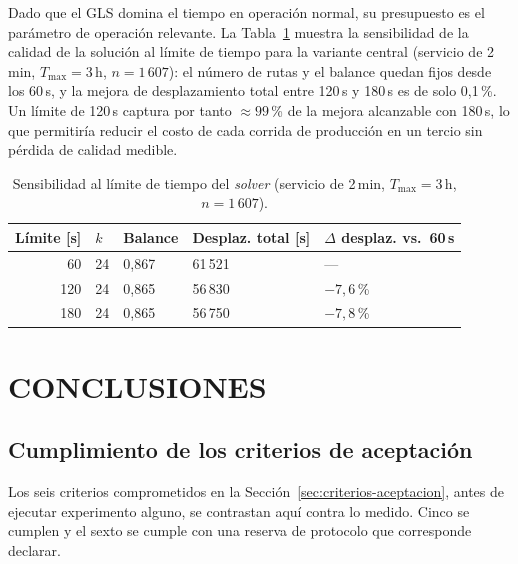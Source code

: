 Dado que el GLS domina el tiempo en operación normal, su presupuesto es el
parámetro de operación relevante. La Tabla~\ref{tab:sensibilidad-tl} muestra la
sensibilidad de la calidad de la solución al límite de tiempo para la variante
central (servicio de 2\,min, $T_{\max}=3$\,h, $n=1\,607$): el número de rutas y
el balance quedan fijos desde los 60\,s, y la mejora de desplazamiento total
entre 120\,s y 180\,s es de solo 0,1\,\%. Un límite de 120\,s captura por tanto
$\approx 99$\,\% de la mejora alcanzable con 180\,s, lo que permitiría reducir
el costo de cada corrida de producción en un tercio sin pérdida de calidad
medible.

\begin{table}[H]
  \centering
  \caption{Sensibilidad al límite de tiempo del \textit{solver} (servicio de 2\,min, $T_{\max}=3$\,h, $n=1\,607$).}
  \label{tab:sensibilidad-tl}
  \begin{tabularx}{\textwidth}{rXXXX}
    \toprule
    Límite [s] & $k$ & Balance & Desplaz. total [s] & $\Delta$ desplaz. vs.\ 60\,s \\
    \midrule
    60  & 24 & 0{,}867 & 61\,521 & --- \\
    120 & 24 & 0{,}865 & 56\,830 & $-7{,}6$\,\% \\
    180 & 24 & 0{,}865 & 56\,750 & $-7{,}8$\,\% \\
    \bottomrule
  \end{tabularx}
\end{table}

\section{CONCLUSIONES}
\label{sec:conclusiones}

\subsection{Cumplimiento de los criterios de aceptación}

Los seis criterios comprometidos en la Sección~\ref{sec:criterios-aceptacion}, antes
de ejecutar experimento alguno, se contrastan aquí contra lo medido. Cinco se cumplen
y el sexto se cumple con una reserva de protocolo que corresponde declarar.

